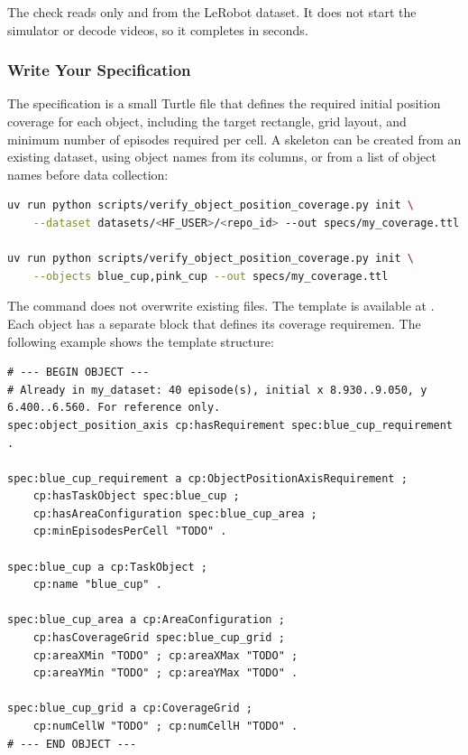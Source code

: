 \documentclass[11pt]{article}
\DeclareRobustCommand{\code}{\codeurl}  %
\begin{document}
The check reads only  and  from the LeRobot dataset. It does not start the simulator or decode videos, so it completes in seconds.


\subsubsection{Write Your Specification}

The specification is a small Turtle file \cite{w3cTurtle} that defines the required initial position coverage for each object, including the target rectangle, grid layout, and minimum number of episodes required per cell. A skeleton can be created from an existing dataset, using object names from its \code{object_position.*} columns, or from a list of object names before data collection:

\begin{lstlisting}[language=bash]
uv run python scripts/verify_object_position_coverage.py init \
    --dataset datasets/<HF_USER>/<repo_id> --out specs/my_coverage.ttl

uv run python scripts/verify_object_position_coverage.py init \
    --objects blue_cup,pink_cup --out specs/my_coverage.ttl
\end{lstlisting}

The \code{init} command does not overwrite existing files. The template is available at . Each object has a separate block that defines its coverage requiremen. The following example shows the template structure:

\begin{lstlisting}[language=turtle]
# --- BEGIN OBJECT ---
# Already in my_dataset: 40 episode(s), initial x 8.930..9.050, y 6.400..6.560. For reference only.
spec:object_position_axis cp:hasRequirement spec:blue_cup_requirement .

spec:blue_cup_requirement a cp:ObjectPositionAxisRequirement ;
    cp:hasTaskObject spec:blue_cup ;
    cp:hasAreaConfiguration spec:blue_cup_area ;
    cp:minEpisodesPerCell "TODO" .

spec:blue_cup a cp:TaskObject ;
    cp:name "blue_cup" .

spec:blue_cup_area a cp:AreaConfiguration ;
    cp:hasCoverageGrid spec:blue_cup_grid ;
    cp:areaXMin "TODO" ; cp:areaXMax "TODO" ;
    cp:areaYMin "TODO" ; cp:areaYMax "TODO" .

spec:blue_cup_grid a cp:CoverageGrid ;
    cp:numCellW "TODO" ; cp:numCellH "TODO" .
# --- END OBJECT ---
\end{lstlisting}
\end{document}

